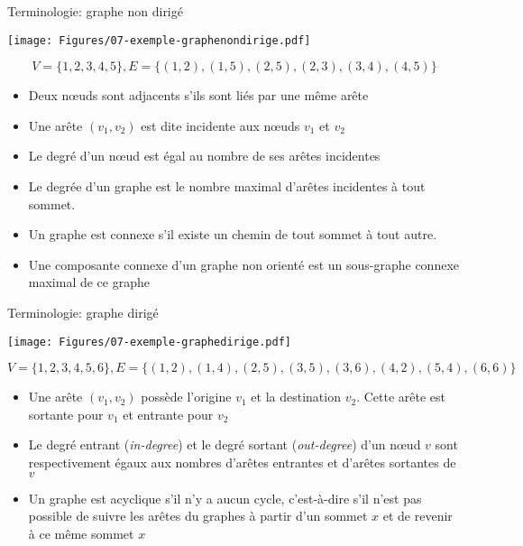 \begin{frame}{Terminologie: graphe non dirigé}

\centerline{\texttt{[image: Figures/07-exemple-graphenondirige.pdf]}}
{\small $$V=\{1,2,3,4,5\}, E=\{(1,2),(1,5),(2,5),(2,3),(3,4),(4,5)\}$$}
\begin{itemize}
\item Deux n\oe uds sont \alert{adjacents} s'ils sont liés par une même arête
\item Une arête $(v_1,v_2)$ est dite \alert{incidente} aux n\oe uds $v_1$ et $v_2$
\item Le \alert{degré} d'un n\oe ud est égal au nombre de ses arêtes incidentes
\item Le \alert{degrée d'un graphe} est le nombre maximal d'arêtes incidentes à tout sommet.
\item Un graphe est \alert{connexe} s'il existe un chemin de tout sommet à tout autre.
\item Une \alert{composante connexe} d'un graphe non orienté est un sous-graphe connexe
  maximal de ce graphe
\end{itemize}

\end{frame}

\begin{frame}{Terminologie: graphe dirigé}

\centerline{\texttt{[image: Figures/07-exemple-graphedirige.pdf]}}
{\small $$V=\{1,2,3,4,5,6\}, E=\{(1,2),(1,4),(2,5),(3,5),(3,6),(4,2),(5,4),(6,6)\}$$}
\begin{itemize}
\item Une arête $(v_1,v_2)$ possède l'\alert{origine} $v_1$ et la \alert{destination}
  $v_2$. Cette arête est \alert{sortante} pour $v_1$ et \alert{entrante} pour $v_2$
\item Le degré \alert{entrant} ({\it in-degree}) et le degré \alert{sortant}
  ({\it out-degree}) d'un n\oe ud $v$ sont respectivement égaux aux nombres d'arêtes entrantes et d'arêtes sortantes de $v$
\item Un graphe est \alert{acyclique} s'il n'y a aucun cycle, c'est-à-dire
  s'il n'est pas possible de suivre les arêtes du graphes à partir
  d'un sommet $x$ et de revenir à ce même sommet $x$
\end{itemize}

\end{frame}


